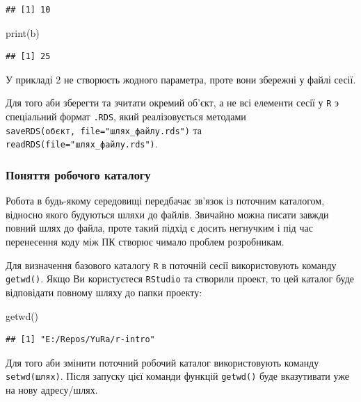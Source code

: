 \documentclass[
]{book}
\newenvironment{Shaded}{\begin{snugshade}}{\end{snugshade}}
\newcommand{\FunctionTok}[1]{\textcolor[rgb]{0.00,0.00,0.00}{#1}}
\newcommand{\NormalTok}[1]{#1}
\begin{document}
\begin{verbatim}
## [1] 10
\end{verbatim}

\begin{Shaded}
\begin{Highlighting}[]
\FunctionTok{print}\NormalTok{(b)}
\end{Highlighting}
\end{Shaded}

\begin{verbatim}
## [1] 25
\end{verbatim}

У прикладі 2 не створюєть жодного параметра, проте вони збережні у файлі сесії.

Для того аби зберегти та зчитати окремий об'єкт, а не всі елементи сесії у \texttt{R} э спеціальний формат \texttt{.RDS}, який реалізовується методами \texttt{saveRDS(об\textquotesingle{}єкт,\ file="шлях\_файлу.rds")} та \texttt{readRDS(file="шлях\_файлу.rds")}.

\hypertarget{chapter1314}{%
\subsubsection{Поняття робочого каталогу}\label{chapter1314}}

Робота в будь-якому середовищі передбачає зв'язок із поточним каталогом, відносно якого будуються шляхи до файлів. Звичайно можна писати завжди повний шлях до файла, проте такий підхід є досить негнучким і під час перенесення коду між ПК створює чимало проблем розробникам.

Для визначення базового каталогу \texttt{R} в поточній сесії використовують команду \texttt{getwd()}. Якщо Ви користуєтеся \texttt{RStudio} та створили проект, то цей каталог буде відповідати повному шляху до папки проекту:

\begin{Shaded}
\begin{Highlighting}[]
\FunctionTok{getwd}\NormalTok{()}
\end{Highlighting}
\end{Shaded}

\begin{verbatim}
## [1] "E:/Repos/YuRa/r-intro"
\end{verbatim}

Для того аби змінити поточний робочий каталог використовують команду \texttt{setwd(шлях)}. Після запуску цієї команди функцій \texttt{getwd()} буде вказутивати уже на нову адресу/шлях.
\end{document}
